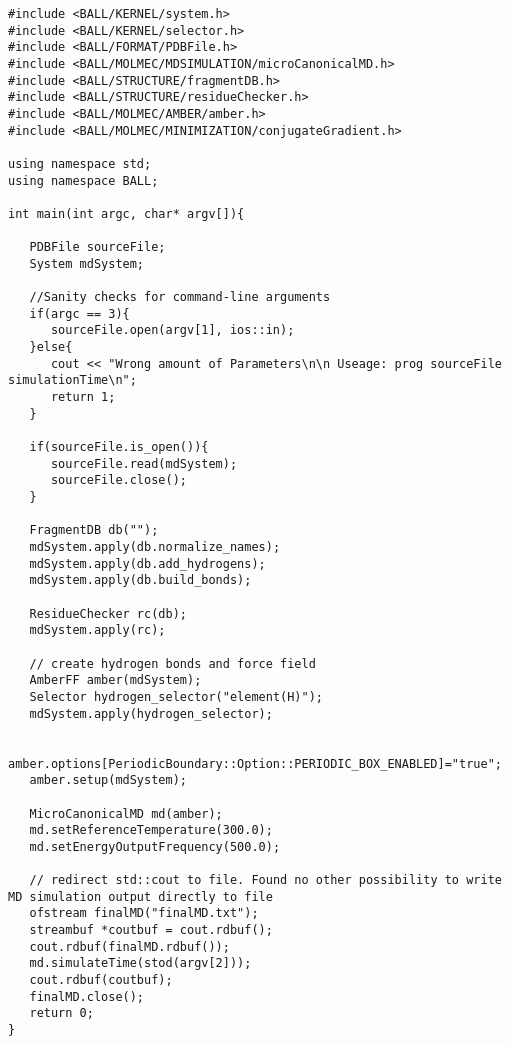 \documentclass[11pt]{article}
\begin{document}
\begin{lstlisting}
#include <BALL/KERNEL/system.h>
#include <BALL/KERNEL/selector.h>
#include <BALL/FORMAT/PDBFile.h>
#include <BALL/MOLMEC/MDSIMULATION/microCanonicalMD.h>
#include <BALL/STRUCTURE/fragmentDB.h>
#include <BALL/STRUCTURE/residueChecker.h>
#include <BALL/MOLMEC/AMBER/amber.h>
#include <BALL/MOLMEC/MINIMIZATION/conjugateGradient.h>

using namespace std;
using namespace BALL;

int main(int argc, char* argv[]){

   PDBFile sourceFile;
   System mdSystem;

   //Sanity checks for command-line arguments	
   if(argc == 3){
      sourceFile.open(argv[1], ios::in);
   }else{
      cout << "Wrong amount of Parameters\n\n Useage: prog sourceFile simulationTime\n";
      return 1;
   }

   if(sourceFile.is_open()){
      sourceFile.read(mdSystem);
      sourceFile.close();
   }

   FragmentDB db("");
   mdSystem.apply(db.normalize_names);
   mdSystem.apply(db.add_hydrogens);
   mdSystem.apply(db.build_bonds);

   ResidueChecker rc(db);
   mdSystem.apply(rc);

   // create hydrogen bonds and force field 
   AmberFF amber(mdSystem);
   Selector hydrogen_selector("element(H)");
   mdSystem.apply(hydrogen_selector);

   amber.options[PeriodicBoundary::Option::PERIODIC_BOX_ENABLED]="true";
   amber.setup(mdSystem);

   MicroCanonicalMD md(amber);
   md.setReferenceTemperature(300.0);
   md.setEnergyOutputFrequency(500.0);

   // redirect std::cout to file. Found no other possibility to write MD simulation output directly to file 
   ofstream finalMD("finalMD.txt");
   streambuf *coutbuf = cout.rdbuf();
   cout.rdbuf(finalMD.rdbuf());
   md.simulateTime(stod(argv[2]));
   cout.rdbuf(coutbuf);
   finalMD.close();
   return 0;
}

\end{lstlisting}
\end{document}
